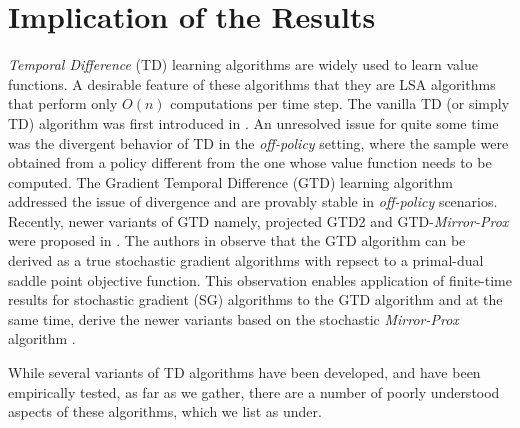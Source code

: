 \section{Implication of the Results}
\emph{Temporal Difference} (TD) learning algorithms \cite{} are widely used to learn value functions. A desirable feature of these algorithms that they are LSA algorithms that perform only $O(n)$ computations per time step. The vanilla TD (or simply TD) algorithm was first introduced in \cite{}. An unresolved issue for quite some time was the divergent behavior of TD in the \emph{off-policy} setting, where the sample were obtained from a policy different from the one whose value function needs to be computed. The Gradient Temporal Difference (GTD) learning algorithm \cite{} addressed the issue of divergence and are provably stable in \emph{off-policy} scenarios.
Recently, newer variants of GTD namely, projected GTD2 and GTD-\emph{Mirror-Prox} were proposed in \cite{}. The authors in \cite{} observe that the GTD algorithm can be derived as a true stochastic gradient algorithms with repsect to a primal-dual saddle point objective function. This observation enables application of finite-time results for stochastic gradient (SG) algorithms to the GTD algorithm and at the same time, derive the newer variants based on the stochastic \emph{Mirror-Prox} algorithm \cite{}.\par
While several variants of TD algorithms have been developed, and have been empirically tested, as far as we gather, there are a number of poorly understood aspects of these algorithms, which we list as under.
